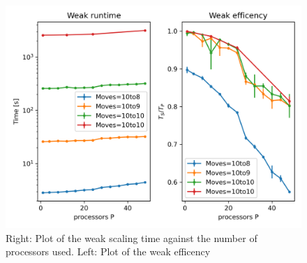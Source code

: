 \documentclass[a4paper]{article}
\begin{document}
\begin{figure}[h]
    \centering
    \includegraphics[scale=0.9]{weak_scaling.png}
    \caption{Right: Plot of the weak scaling time against the number of processors used. Left: Plot of the weak efficency}
    \label{fig:weak_scaling}
\end{figure}
\end{document}
